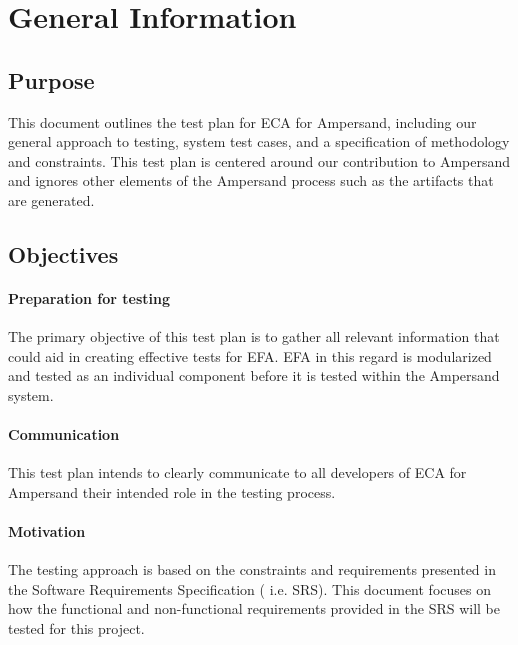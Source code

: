 \documentclass[12pt]{report}
\begin{document}
%
%

\chapter{General Information}\label{ch:General}

\section{Purpose}\label{sec:Purpose}
This document outlines the test plan for ECA for Ampersand, including our
general approach to testing, system test cases, and a specification of
methodology and constraints. This test plan is centered around our contribution 
to Ampersand and ignores other elements of the Ampersand process such as the 
artifacts that are generated.

\section{Objectives}\label{sec:Objectives}
\subsubsection*{Preparation for testing}
The primary objective of this test plan is to gather all relevant information 
that could aid in creating effective tests for EFA. EFA in this regard is 
modularized and tested as an individual component before it is tested within 
the Ampersand system. 

\subsubsection*{Communication}
This test plan intends to clearly communicate to all developers of ECA for 
Ampersand their intended role in the testing process. 

\subsubsection*{Motivation}
The testing approach is based on the constraints and requirements presented in 
the Software Requirements Specification \big( i.e. SRS\big).
This document 
focuses on 
how the functional and non-functional requirements provided in the SRS will be 
tested for this project.
\end{document}
